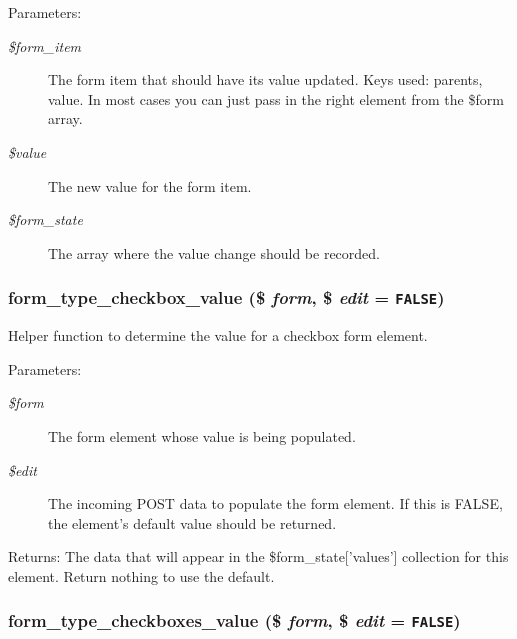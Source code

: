 \begin{Desc}
\item[Parameters:]
\begin{description}
\item[{\em \$form\_\-item}]The form item that should have its value updated. Keys used: parents, value. In most cases you can just pass in the right element from the \$form array. \item[{\em \$value}]The new value for the form item. \item[{\em \$form\_\-state}]The array where the value change should be recorded. \end{description}
\end{Desc}
\hypertarget{group__form__api_gfe73ec471140a71b1d3f2810b4363592}{
\subsubsection[{form\_\-type\_\-checkbox\_\-value}]{\setlength{\rightskip}{0pt plus 5cm}form\_\-type\_\-checkbox\_\-value (\$ {\em form}, \/  \$ {\em edit} = {\tt FALSE})}}
\label{group__form__api_gfe73ec471140a71b1d3f2810b4363592}


Helper function to determine the value for a checkbox form element.

\begin{Desc}
\item[Parameters:]
\begin{description}
\item[{\em \$form}]The form element whose value is being populated. \item[{\em \$edit}]The incoming POST data to populate the form element. If this is FALSE, the element's default value should be returned. \end{description}
\end{Desc}
\begin{Desc}
\item[Returns:]The data that will appear in the \$form\_\-state\mbox{[}'values'\mbox{]} collection for this element. Return nothing to use the default. \end{Desc}
\hypertarget{group__form__api_g01c5405a174f6854caa1487451783ff1}{
\subsubsection[{form\_\-type\_\-checkboxes\_\-value}]{\setlength{\rightskip}{0pt plus 5cm}form\_\-type\_\-checkboxes\_\-value (\$ {\em form}, \/  \$ {\em edit} = {\tt FALSE})}}
\label{group__form__api_g01c5405a174f6854caa1487451783ff1}


